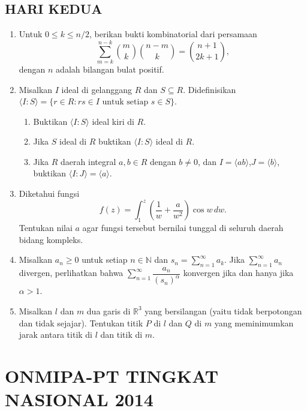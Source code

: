 \documentclass[12pt,twoside]{article}
\begin{document}
\subsection{HARI KEDUA}
\begin{enumerate}
    \item Untuk $0\leq k\leq n/2$, berikan bukti kombinatorial dari persamaan
          $$\sum_{m=k}^{n-k}\binom{m}{k}\binom{n-m}{k}=\binom{n+1}{2k+1},$$
          dengan $n$ adalah bilangan bulat positif.

    \item Misalkan $I$ ideal di gelanggang $R$ dan $S\subseteq R$. Didefinisikan $\langle I:S\rangle=\{r\in R:rs\in I\text  { untuk setiap } s\in S\}$.
          \begin{enumerate}
              \item [(a)]Buktikan $\langle I:S\rangle$ ideal kiri di $R$.
              \item[(b)] Jika $S$ ideal di $R$ buktikan $\langle I:S\rangle$ ideal di $R$.
              \item[(c)] Jika $R$ daerah integral $a,b\in R$ dengan $b\neq 0$, dan $I=\langle ab\rangle$,$J=\langle b\rangle$, buktikan $\langle I:J\rangle=\langle a\rangle$.
          \end{enumerate}

    \item Diketahui fungsi
          $$f(z)=\int_{1}^{z}\left(\dfrac{1}{w}+\dfrac{a}{w^2}\right)\cos w\,dw.$$
          Tentukan nilai $a$ agar fungsi tersebut bernilai tunggal di seluruh daerah bidang kompleks.

    \item Misalkan $a_n\geq 0$ untuk setiap $n\in\mathbb{N}$ dan $\displaystyle s_n=\sum_{n=1}^{\infty}a_k$. Jika $\displaystyle \sum_{n=1}^{\infty}a_n$ divergen, perlihatkan bahwa $\displaystyle \sum_{n=1}^{\infty}\dfrac{a_n}{(s_n)^{\alpha}}$ konvergen jika dan hanya jika $\alpha>1$.

    \item Misalkan $l$ dan $m$ dua garis di $\mathbb{R}^3$ yang bersilangan (yaitu tidak berpotongan dan tidak sejajar). Tentukan titik $P$ di $l$ dan $Q$ di $m$ yang meminimumkan jarak antara titik di $l$ dan titik di $m$.
\end{enumerate}
\newpage
{}
\section{ONMIPA-PT TINGKAT NASIONAL 2014}
\end{document}
